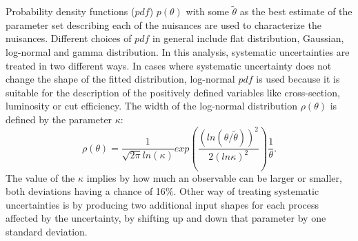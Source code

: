 Probability density functions ($pdf$) $p(\theta)$ with some $\widetilde{\theta}$ as the best estimate of the parameter set describing each of the nuisances are used to characterize the nuisances. Different choices of $pdf$ in general include flat distribution, Gaussian, log-normal and gamma distribution. In this analysis, systematic uncertainties are treated in two different ways. In cases where systematic uncertainty does not change the shape of the fitted distribution, log-normal $pdf$ is used because it is suitable for the description of the positively defined variables like cross-section, luminosity or cut efficiency. The width of the log-normal distribution $\rho(\theta)$ is defined by the parameter $\kappa$:
\begin{equation}
\rho(\theta) = \frac{1}{\sqrt{2\pi}ln(\kappa)}exp\left(\frac{(ln(\theta/\widetilde{\theta}))^2}{2(ln \kappa)^2}\right)\frac{1}{\theta}.
\end{equation}
The value of the $\kappa$ implies by how much an observable can be larger or smaller, both deviations having a chance of 16$\%$. Other way of treating systematic uncertainties is by producing two additional input shapes for each process affected by the uncertainty, by shifting up and down that parameter by one standard deviation. 
